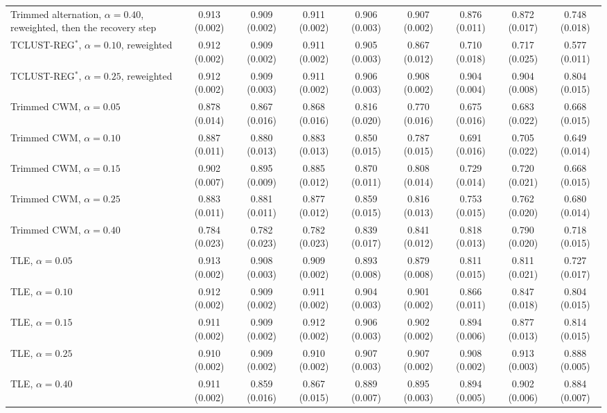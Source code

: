 \begin{table}[htbp]
{\begin{tabular}{lcccccccc}
Trimmed alternation, $\alpha=0.40$, reweighted, then the recovery step & 0.913 (0.002) & 0.909 (0.002) & 0.911 (0.002) & 0.906 (0.003) & 0.907 (0.002) & 0.876 (0.011) & 0.872 (0.017) & 0.748 (0.018) \\
TCLUST-REG$^{\ast}$, $\alpha=0.10$, reweighted & 0.912 (0.002) & 0.909 (0.002) & 0.911 (0.002) & 0.905 (0.003) & 0.867 (0.012) & 0.710 (0.018) & 0.717 (0.025) & 0.577 (0.011) \\
TCLUST-REG$^{\ast}$, $\alpha=0.25$, reweighted & 0.912 (0.002) & 0.909 (0.003) & 0.911 (0.002) & 0.906 (0.003) & 0.908 (0.002) & 0.904 (0.004) & 0.904 (0.008) & 0.804 (0.015) \\
Trimmed CWM, $\alpha=0.05$ & 0.878 (0.014) & 0.867 (0.016) & 0.868 (0.016) & 0.816 (0.020) & 0.770 (0.016) & 0.675 (0.016) & 0.683 (0.022) & 0.668 (0.015) \\
Trimmed CWM, $\alpha=0.10$ & 0.887 (0.011) & 0.880 (0.013) & 0.883 (0.013) & 0.850 (0.015) & 0.787 (0.015) & 0.691 (0.016) & 0.705 (0.022) & 0.649 (0.014) \\
Trimmed CWM, $\alpha=0.15$ & 0.902 (0.007) & 0.895 (0.009) & 0.885 (0.012) & 0.870 (0.011) & 0.808 (0.014) & 0.729 (0.014) & 0.720 (0.021) & 0.668 (0.015) \\
Trimmed CWM, $\alpha=0.25$ & 0.883 (0.011) & 0.881 (0.011) & 0.877 (0.012) & 0.859 (0.015) & 0.816 (0.013) & 0.753 (0.015) & 0.762 (0.020) & 0.680 (0.014) \\
Trimmed CWM, $\alpha=0.40$ & 0.784 (0.023) & 0.782 (0.023) & 0.782 (0.023) & 0.839 (0.017) & 0.841 (0.012) & 0.818 (0.013) & 0.790 (0.020) & 0.718 (0.015) \\
TLE, $\alpha=0.05$ & 0.913 (0.002) & 0.908 (0.003) & 0.909 (0.002) & 0.893 (0.008) & 0.879 (0.008) & 0.811 (0.015) & 0.811 (0.021) & 0.727 (0.017) \\
TLE, $\alpha=0.10$ & 0.912 (0.002) & 0.909 (0.002) & 0.911 (0.002) & 0.904 (0.003) & 0.901 (0.002) & 0.866 (0.011) & 0.847 (0.018) & 0.804 (0.015) \\
TLE, $\alpha=0.15$ & 0.911 (0.002) & 0.909 (0.002) & 0.912 (0.002) & 0.906 (0.003) & 0.902 (0.002) & 0.894 (0.006) & 0.877 (0.013) & 0.814 (0.015) \\
TLE, $\alpha=0.25$ & 0.910 (0.002) & 0.909 (0.002) & 0.910 (0.002) & 0.907 (0.003) & 0.907 (0.002) & 0.908 (0.002) & 0.913 (0.003) & 0.888 (0.005) \\
TLE, $\alpha=0.40$ & 0.911 (0.002) & 0.859 (0.016) & 0.867 (0.015) & 0.889 (0.007) & 0.895 (0.003) & 0.894 (0.005) & 0.902 (0.006) & 0.884 (0.007) \\

\end{tabular}}
\end{table}
